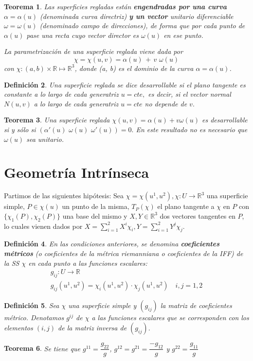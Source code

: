 \documentclass[twoside]{article}
\newtheorem{theorem}{Teorema}[section]
\newtheorem{defi}[theorem]{Definición}
\numberwithin{equation}{section}
\newcommand{\R}{\mathbb{R}}
\providecommand{\func}[2]{\colon{#1}\longrightarrow{#2}}
\begin{document}
\begin{theorem} Las superficies regladas est\'an {\bf engendradas por una curva}
{\bf $\alpha = \alpha(u)$}
(deno\-minada {\em curva directriz}) {\bf y un vector} unitario
diferenciable {\bf $\omega = \omega(u)$} (denominado {\em campo de direcciones}), de forma que por cada punto de
$\alpha(u)$ pase una recta cuyo vector director es $\omega(u)$ en ese punto.

\vspace{0.20cm}

La parametrizaci\'on de una superficie reglada viene dada por
$$
\chi = \chi(u,v) = \alpha(u) \, + \, v \,\, \omega(u)
$$
con
$\chi: (a, b) \times \mathbb{R} \mapsto \mathbb{R}^3$, donde (a, b) es el
dominio de la curva  $\alpha = \alpha(u)$.
\end{theorem}

\begin{defi} Una superficie reglada se dice {\em desarrollable} si el plano tangente es constante a lo largo de cada generatriz $u = cte,$ es decir, si el vector normal $N(u,v)$ a lo largo de cada generatriz $u = cte$ no depende de $v.$
\end{defi}

\begin{theorem} Una superficie reglada $\chi(u,v) = \alpha(u) + v \omega(u)$ es desarrollable si y sólo si $(\alpha'(u) \,\, \omega(u) \,\, \omega'(u)) = 0.$
En este resultado no es necesario que $\omega(u)$ sea unitario.
\end{theorem}
\newpage
\section{Geometría Intrínseca}
Partimos de las siguientes hipótesis: Sea $\chi=\chi(u^1,u^2), \chi\func{U}{\R^3}$ una superficie simple, $P\in\chi(u)$ un punto de la misma, $T_P(\chi)$ el plano tangente a $\chi$ en $P$ con $\{\chi_1(P),\chi_2(P)\}$ una base del mismo y $X,Y \in\R^3$ dos vectores tangentes en $P$, lo cuales vienen dados por $X=\sum_{i=1}^{2}X^i\chi_i, Y=\sum_{i=1}^{2}Y^j\chi_j$.

\begin{defi} En las condiciones anteriores, se denomina \textbf{coeficientes métricos} (o coeficientes de la métrica riemanniana o coeficientes de la IFF) de la SS $\chi$ en cada punto a las funciones escalares:
\begin{gather*}
g_{ij}\func{U}{\R}\\
g_{ij}(u^1,u^2)=\chi_i(u^1,u^2)\cdot\chi_j(u^1,u^2) \quad i,j=1,2
\end{gather*}
\end{defi}
\begin{defi} Sea $\chi$ una superficie simple y $(g_{ij})$ la matriz de coeficientes métrico. Denotamos $g^{ij}$ de $\chi$ a las funciones escalares que se corresponden con los elementos $(i,j)$ de la matriz inversa de $(g_{ij})$.
\end{defi}
\begin{theorem}
Se tiene que $g^{11}=\dfrac{g_{22}}{g}$, $g^{12}=g^{21}=\dfrac{-g_{12}}{g}$ y $g^{22}=\dfrac{g_{11}}{g}$
\end{theorem}
\end{document}
